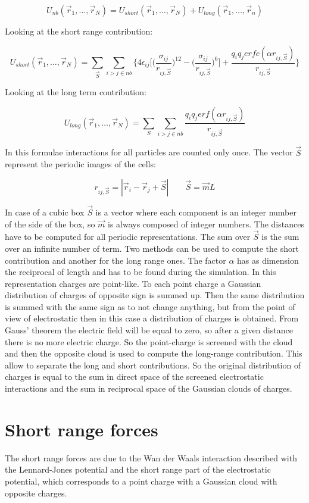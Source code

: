 	$$U_{nb}(\vec{r}_1, \dots, \vec{r}_N) = U_{short}(\vec{r}_1, \dots, \vec{r}_N) + U_{long}(\vec{r}_1, \dots, \vec{r}_n)$$

	Looking at the short range contribution:

	$$U_{short}(\vec{r}_1, \dots, \vec{r}_N) = \sum\limits_{\vec{S}}\sum\limits_{i>j\in nb}\biggl\{4\epsilon_{ij}\biggl[\biggl(\frac{\sigma_{ij}}{r_{ij,\vec{S}}}\biggr)^{12}-\biggl(\frac{\sigma_{ij}}{r_{ij, \vec{S}}}\biggr)^6\biggr] + \frac{q_iq_jerfc(\alpha r_{ij, \vec{S}})}{r_{ij, \vec{S}}}\biggr\}$$

	Looking at the long term contribution:

	$$U_{long}(\vec{r}_1, \dots, \vec{r}_N) = \sum\limits_S\sum\limits_{i>j\in nb} \frac{q_iq_j erf(\alpha r_{ij, \vec{S}})}{r_{ij, \vec{S}}}$$

	In this formulae interactions for all particles are counted only once.
	The vector $\vec{S}$ represent the periodic images of the cells:

	$$r_{ij, \vec{S}} = |\vec{r}_i-\vec{r}_j + \vec{S}|\qquad \vec{S} = \vec{m}L$$

	In case of a cubic box $\vec{S}$ is a vector where each component is an integer number of the side of the box, so $\vec{m}$ is always composed of integer numbers.
	The distances have to be computed for all periodic representations.
	The sum over $\vec{S}$ is the sum over an infinite number of term.
	Two methods can be used to compute the short contribution and another for the long range ones.
	The factor $\alpha$ has as dimension the reciprocal of length and has to be found during the simulation.
	In this representation charges are point-like.
	To each point charge a Gaussian distribution of charges of opposite sign is summed up.
	Then the same distribution is summed with the same sign as to not change anything, but from the point of view of electrostatic then in this case a distribution of charges is obtained.
	From Gauss' theorem the electric field will be equal to zero, so after a given distance there is no more electric charge.
	So the point-charge is screened with the cloud and then the opposite cloud is used to compute the long-range contribution.
	This allow to separate the long and short contributions.
	So the original distribution of charges is equal to the sum in direct space of the screened electrostatic interactions and the sum in reciprocal space of the Gaussian clouds of charges.

\section{Short range forces}
The short range forces are due to the Wan der Waals interaction described with the Lennard-Jones potential and the short range part of the electrostatic potential, which corresponds to a point charge with a Gaussian cloud with opposite charges.

